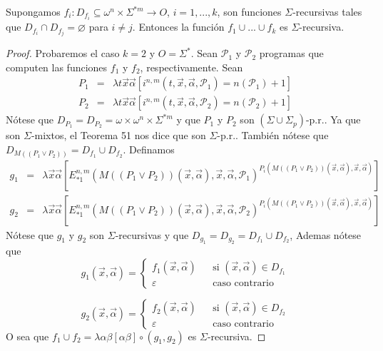   \begin{lemma}
    Supongamos \(f_{i}:D_{f_{i}}\subseteq \omega ^{n}\times \Sigma ^{\ast m}\rightarrow O\), \(i=1,...,k\), 
    son funciones \(\Sigma \)-recursivas tales que \(D_{f_{i}}\cap D_{f_{j}}=\varnothing \) para \(i\neq j\).
    Entonces la función \(f_{1}\cup ...\cup f_{k}\) es \(\Sigma \)-recursiva.
  \begin{proof}
    Probaremos el caso \(k=2\) y \(O=\Sigma ^{\ast }\). Sean \(\mathcal{P}_{1}\) y \( \mathcal{P}_{2}\) programas que 
    computen las funciones \(f_{1}\) y \(f_{2}\), respectivamente. Sean
    \[
      \displaystyle \begin{array}{rcl} P_{1} & =& \lambda t\vec{x}\vec{\alpha}\left[ i^{n,m}(t,\vec{x},\vec{\alpha}, 
      \mathcal{P}_{1})=n(\mathcal{P}_{1})+1\right] \\ P_{2} & =& \lambda t\vec{x}\vec{\alpha}\left[ i^{n,m}(t,\vec{x},
      \vec{\alpha}, \mathcal{P}_{2})=n(\mathcal{P}_{2})+1\right] \end{array}
    \]
    Nótese que \(D_{P_{1}}=D_{P_{2}}=\omega \times \omega ^{n}\times \Sigma ^{\ast m}\) y que \(P_{1}\) y \(P_{2}\) 
    son \((\Sigma \cup \Sigma _{p})\)-p.r.. Ya que son \(\Sigma \)-mixtos, el Teorema 51 nos dice que son 
    \( \Sigma \)-p.r.. También nótese que \(D_{M((P_{1}\vee P_{2}))}=D_{f_{1}}\cup D_{f_{2}}\). Definamos
    \[
      \displaystyle \begin{array}{rcl} g_{1} & =& \lambda \vec{x}\vec{\alpha}\left[ E_{\ast 1}^{n,m}(M\left( (P_{1}\vee
       P_{2})\right) (\vec{x},\vec{\alpha}),\vec{x},\vec{\alpha}, \mathcal{P}_{1})^{P_{i}(M\left( (P_{1}\vee P_{2})
       \right) (\vec{x},\vec{\alpha }),\vec{x},\vec{\alpha})}\right] \\ g_{2} & =& \lambda \vec{x}\vec{\alpha}\left[
       E_{\ast 1}^{n,m}(M\left( (P_{1}\vee P_{2})\right) (\vec{x},\vec{\alpha}),\vec{x},\vec{\alpha}, \mathcal{P}_{2})
       ^{P_{i}(M\left( (P_{1}\vee P_{2})\right) (\vec{x},\vec{\alpha }),\vec{x},\vec{\alpha})}\right] \end{array}
    \]
    Nótese que \(g_{1}\) y \(g_{2}\) son \(\Sigma \)-recursivas y que \( D_{g_{1}}=D_{g_{2}}=D_{f_{1}}\cup D_{f_{2}}\),
    Ademas nótese que
    \[
      \displaystyle g_{1}(\vec{x},\vec{\alpha})=\left\{ \begin{array}{lll} f_{1}(\vec{x},\vec{\alpha}) & & \text{si }
      (\vec{x},\vec{\alpha})\in D_{f_{1}} \\ \varepsilon & & \text{caso contrario} \end{array} \right.
    \]

    \[
      \displaystyle g_{2}(\vec{x},\vec{\alpha})=\left\{ \begin{array}{lll} f_{2}(\vec{x},\vec{\alpha}) & & \text{si }
      (\vec{x},\vec{\alpha})\in D_{f_{2}} \\ \varepsilon & & \text{caso contrario} \end{array} \right.
    \]
    O sea que \(f_{1}\cup f_{2}=\lambda \alpha \beta \left[ \alpha \beta \right] \circ (g_{1},g_{2})\) es 
    \(\Sigma \)-recursiva.
  \end{proof}
  \end{lemma}

